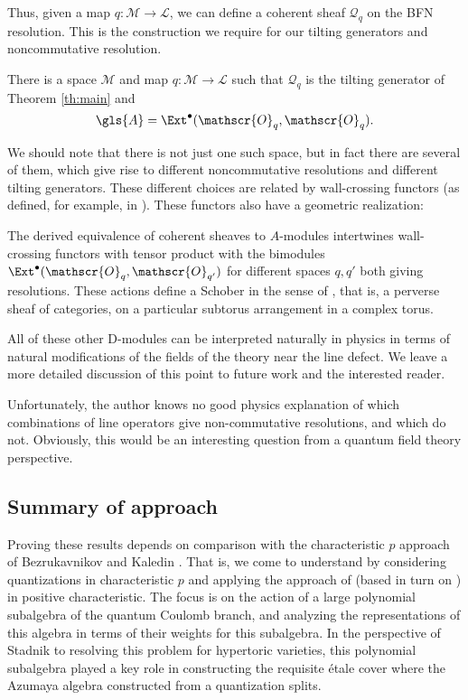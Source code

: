 Thus, given a map  $q\colon \mathcal{M}\to \mathcal{L}$, we can define a coherent
sheaf $\mathcal{Q}_q$ on the BFN resolution.  This is the construction
we require for our tilting generators and noncommutative resolution.
\begin{itheorem}
  There is a space  $\mathcal{M}$ and map $q\colon \mathcal{M}\to \mathcal{L}$ such
  that $ \mathcal{Q}_q$ is the tilting generator of Theorem
  \ref{th:main} and  \[\gls{A}=\Ext^\bullet(\mathscr{O}_{q},
    \mathscr{O}_{q}).\]
\end{itheorem}
We should note that there is not just one such space, but in fact
there are several of them, which give rise to different noncommutative
resolutions and different tilting generators.  These different choices
are related by wall-crossing
functors (as defined, for example, in \cite[\S
2.5.1]{losev2017modular}).  These functors also have a geometric
realization:
\begin{itheorem}
The derived equivalence of coherent sheaves to $A$-modules
intertwines wall-crossing functors with tensor product with the
bimodules $\Ext^\bullet(\mathscr{O}_{q},
    \mathscr{O}_{q'})$ for different spaces $q,q'$ both giving
    resolutions.  These
actions define a Schober in the sense of \cite{KSschobers}, that is,
a perverse sheaf of categories, on a particular subtorus arrangement
in a complex torus.  
\end{itheorem}  
\begin{physics}
  All of these other D-modules can be interpreted naturally in physics
  in terms of natural modifications of the fields of the theory near
  the line defect.  We leave a more detailed discussion of this point
  to future work and the interested reader.

  Unfortunately, the author knows no good physics explanation of
  which combinations of line operators give non-commutative
  resolutions, and which do not.  Obviously, this would be an
  interesting question from a quantum field theory perspective.   
\end{physics}

\subsection{Summary of approach}
\label{sec:summary}

Proving these results depends on comparison with the characteristic
$p$ approach of Bezrukavnikov and Kaledin \cite{BKpos,KalDEQ}.  That
is, we come to understand by considering quantizations in
characteristic $p$ and applying the approach of \cite{WebSD} (based
in turn on \cite{FOD,MVdB}) in
positive characteristic.  The focus is on the
action of a large polynomial subalgebra of the quantum Coulomb branch,
and analyzing the representations of this algebra in terms of their
weights for this subalgebra.  In the perspective of Stadnik \cite{Stadnik} to resolving this problem
for hypertoric varieties,  this polynomial subalgebra played a key
role in constructing the requisite \'etale cover where the Azumaya
algebra constructed from a quantization splits.  

